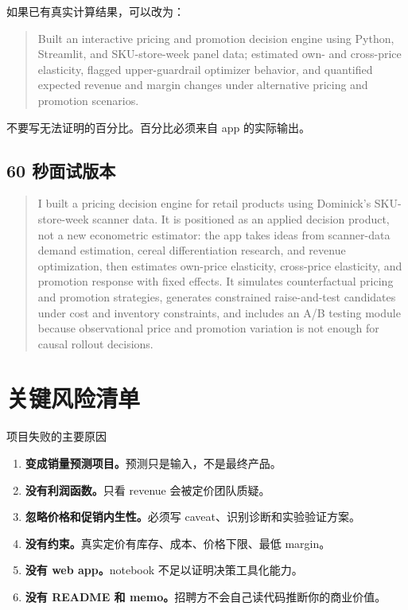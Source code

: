 \documentclass[UTF8,11pt,a4paper,fontset=none]{ctexart}
\begin{document}
如果已有真实计算结果，可以改为：

\begin{quote}
Built an interactive pricing and promotion decision engine using Python, Streamlit, and SKU-store-week panel data; estimated own- and cross-price elasticity, flagged upper-guardrail optimizer behavior, and quantified expected revenue and margin changes under alternative pricing and promotion scenarios.
\end{quote}

不要写无法证明的百分比。百分比必须来自 app 的实际输出。

\subsection{60 秒面试版本}

\begin{quote}
I built a pricing decision engine for retail products using Dominick's SKU-store-week scanner data. It is positioned as an applied decision product, not a new econometric estimator: the app takes ideas from scanner-data demand estimation, cereal differentiation research, and revenue optimization, then estimates own-price elasticity, cross-price elasticity, and promotion response with fixed effects. It simulates counterfactual pricing and promotion strategies, generates constrained raise-and-test candidates under cost and inventory constraints, and includes an A/B testing module because observational price and promotion variation is not enough for causal rollout decisions.
\end{quote}

\section{关键风险清单}

\begin{riskbox}{项目失败的主要原因}
\begin{enumerate}
  \item \textbf{变成销量预测项目。}预测只是输入，不是最终产品。
  \item \textbf{没有利润函数。}只看 revenue 会被定价团队质疑。
  \item \textbf{忽略价格和促销内生性。}必须写 caveat、识别诊断和实验验证方案。
  \item \textbf{没有约束。}真实定价有库存、成本、价格下限、最低 margin。
  \item \textbf{没有 web app。}notebook 不足以证明决策工具化能力。
  \item \textbf{没有 README 和 memo。}招聘方不会自己读代码推断你的商业价值。
\end{enumerate}
\end{riskbox}
\end{document}
